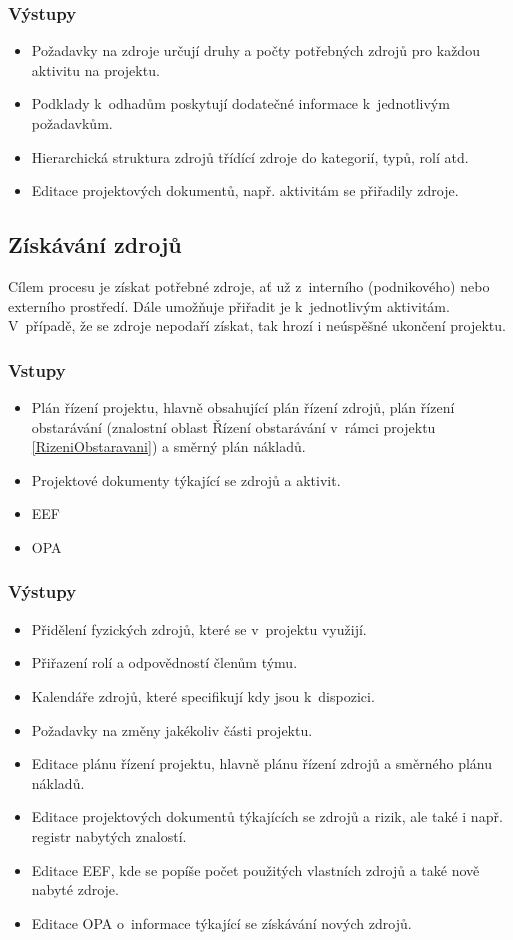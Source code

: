 \subsubsection*{Výstupy}
\begin{itemize}
    \item Požadavky na zdroje určují druhy a počty potřebných zdrojů pro každou aktivitu na projektu.  
    \item Podklady k~odhadům poskytují dodatečné informace k~jednotlivým požadavkům.
    \item Hierarchická struktura zdrojů třídící zdroje do kategorií, typů, rolí atd.
    \item Editace projektových dokumentů, např. aktivitám se přiřadily zdroje.
\end{itemize}

\subsection*{Získávání zdrojů}

Cílem procesu je získat potřebné zdroje, ať už z~interního (podnikového) nebo externího prostředí. Dále umožňuje přiřadit je k~jednotlivým aktivitám. V~případě, že se zdroje nepodaří získat, tak hrozí i neúspěšné ukončení projektu.

\subsubsection*{Vstupy}
\begin{itemize}
    \item Plán řízení projektu, hlavně obsahující plán řízení zdrojů, plán řízení obstarávání (znalostní oblast Řízení obstarávání v~rámci projektu \ref{RizeniObstaravani}) a směrný plán nákladů.
    \item Projektové dokumenty týkající se zdrojů a aktivit.
    \item EEF
    \item OPA
\end{itemize}
\subsubsection*{Výstupy}
\begin{itemize}
    \item Přidělení fyzických zdrojů, které se v~projektu využijí.  
    \item Přiřazení rolí a odpovědností členům týmu.
    \item Kalendáře zdrojů, které specifikují kdy jsou k~dispozici.
    \item Požadavky na změny jakékoliv části projektu.
    \item Editace plánu řízení projektu, hlavně plánu řízení zdrojů a směrného plánu nákladů.
    \item Editace projektových dokumentů týkajících se zdrojů a rizik, ale také i např. registr nabytých znalostí.
    \item Editace EEF, kde se popíše počet použitých vlastních zdrojů a také nově nabyté zdroje.
    \item Editace OPA o~informace týkající se získávání nových zdrojů.
\end{itemize}

